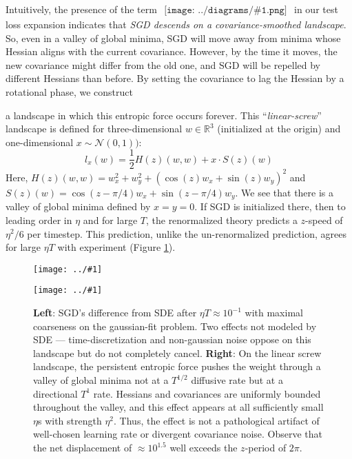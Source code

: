 \documentclass{article}
\newcommand{\Nn}{\mathcal{N}}
\newcommand{\RR}{\mathbb{R}}
\newcommand{\plotmoo}[3]{
    \texttt{[image: ../\#1]}
}
\newcommand{\sdia}[1]{\begin{gathered}\texttt{[image: ../diagrams/\#1.png]}\end{gathered}}
\begin{document}
        Intuitively, the presence of the term
        $
            \sdia{c(01-2-3)(02-12-23)}
        $
        in our test loss expansion indicates that 
        \emph{SGD descends on a covariance-smoothed landscape}.
        So, even in a valley of global minima, SGD will move away from minima
        whose Hessian aligns with the current covariance.  However, by the time
        it moves, the new covariance might differ from the old one, and SGD will
        be repelled by different Hessians than before.  By setting the
        covariance to lag the Hessian by a rotational phase, we construct

        a landscape in which this entropic force occurs forever. 
        This ``\emph{linear-screw}'' landscape is defined for
        three-dimensional $w\in \RR^3$ (initialized at the origin) and
        one-dimensional $x \sim \Nn(0, 1))$:
        $$
            l_x(w) = \frac{1}{2} H(z)(w, w) + x \cdot S(z)(w)  
        $$
        Here, $H(z)(w, w) = w_x^2 + w_y^2 + (\cos(z) w_x + \sin(z) w_y)^2$
        and   $S(z)(w)    = \cos(z-\pi/4) w_x + \sin(z-\pi/4) w_y$.
        We see that there is a valley of global minima defined by $x=y=0$. 
        If SGD is initialized there, then to leading order in $\eta$ and for
        large $T$, the renormalized theory predicts a $z$-speed of $\eta^2/6$ 
        per timestep.  This prediction, unlike the
        un-renormalized prediction, agrees for large $\eta T$
        with experiment (Figure \ref{fig:thermo}).

        \begin{figure}[h!]
            \centering
            \plotmoo{plots/vs-sde}{0.48\columnwidth}{4.0cm}
            \plotmoo{plots/thermo-linear-screw}{0.48\columnwidth}{4.0cm}
            \caption{
                {\bf Left}: SGD's difference from SDE after $\eta T \approx
                10^{-1}$ with maximal coarseness on the gaussian-fit problem.  
                Two effects not modeled by SDE --- time-discretization and
                non-gaussian noise oppose on this landscape but do not
                completely cancel. 
                {\bf Right}: On the linear screw landscape, the persistent
                entropic force pushes the weight through a valley of global
                minima not at a $T^{1/2}$ diffusive rate but at a directional
                $T^1$ rate.  Hessians and covariances  are uniformly bounded
                throughout the valley, and this effect appears at all
                sufficiently small $\eta$s with strength $\eta^2$.  Thus, the
                effect is not a pathological artifact of well-chosen learning
                rate or divergent covariance noise.  Observe that the net
                displacement of $\approx 10^{1.5}$ well exceeds the $z$-period
                of $2\pi$. 
            }
            \label{fig:thermo}
        \end{figure}
\end{document}

